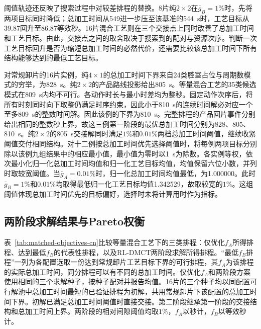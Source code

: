\documentclass[final,5p,times,twocolumn]{elsarticle}
\begin{document}
阈值轨迹还反映了搜索过程中对较差排程的替换。8片纯$2\times2$在$\bar g_B=1\%$时，先将两项目标同时降低；总加工时间从549进一步压至该基准的544~s时，工艺目标从39.87回升至86.87等效秒。16片混合工艺则在三个交接点上同时改善了总加工时间和工艺目标。由此，交接点之间的取舍取决于搜索到的配对与资源次序。判断一次工艺目标回升是否为缩短总加工时间的必然代价，还需要比较该总加工时间下所有结构能够达到的最低工艺目标。

对常规卸片的16片实例，纯$4\times1$的总加工时间下界来自24类腔室占位与周期数模式的穷举，为828~s。纯$2\times2$的产品路线投影给出805~s。等量混合工艺的35类候选模式在809~s内均不可行。各动作时长与最小时差均为整秒。固定动作次序后，将所有时刻同时向下取整仍满足时序约束，因此小于810~s的连续时间解必对应一个至多809~s的整数时间解。因此该例的下界为810~s。完整排程的产品回片事件分别给出相同的整数秒上界，故这三例第一阶段的最优总加工时间分别为828、805、810~s。纯$2\times2$的805~s交接解同时满足$1\%$和$0.01\%$两档总加工时间阈值，继续收紧阈值交付相同结构。对十二例按总加工时间优先选择阈值时，将每例两项目标分别除以该例九组结果中的相应最小值，最小值为零时以1~s为除数。各实例等权，依次最小化归一化总加工时间均值和归一化工艺目标均值，均值保留六位小数，并列时取较宽阈值。当$\bar g_A=0.01\%$时，归一化总加工时间均值最低，为1.000000。此时$\bar g_B=1\%$和$0.01\%$均取得最低归一化工艺目标均值1.342529，故取较宽的$1\%$。这组阈值体现总加工时间优先的目标偏好，选择时未将计算用时作为指标。

\subsection{两阶段求解结果与Pareto权衡}
\label{sec:stage2-validation-cn}

表~\ref{tab:matched-objectives-cn}比较等量混合工艺下的三类排程：仅优化$f_A$所得排程、达到最低$f_B$的代表性排程，以及RL-DMCT两阶段求解所得排程。“最低$f_B$排程”一列为各配置选取一份达到常规卸片工艺目标下界的可行排程，其$f_A$为该排程的实际总加工时间，同分排程可以有不同的总加工时间。仅优化$f_A$和两阶段方案使用相同的三个求解种子，按种子配对并报告均值。16片的三个种子均以同配置可行解池中总加工时间最短的已验证排程为初解，共用常规卸片下该配置的总加工时间下界。初解已满足总加工时间阈值时直接交接。第二阶段继承第一阶段的交接结构和总加工时间上界。两阶段的相对间隙阈值均取$1\%$，$f_A$以秒计，$f_B$以等效秒计。
\end{document}
